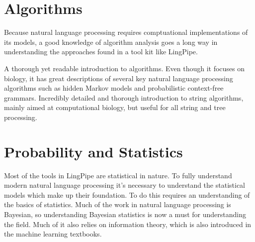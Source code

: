 %


\section{Algorithms}

\noindent
Because natural language processing requires comptuational
implementations of its models, a good knowledge of algorithm analysis
goes a long way in understanding the approaches found in a tool kit
like LingPipe.

\begin{itemize}
%
{A thorough yet readable introduction to algorithms.}
%
{Even though it focuses on biology, it has great
descriptions of several key natural language processing algorithms
such as hidden Markov models and probabilistic context-free grammars.}
%
{Incredibly detailed and thorough introduction to
string algorithms, mainly aimed at computational biology, but
useful for all string and tree processing.}
%
\end{itemize}






\section{Probability and Statistics}

\noindent
Most of the tools in LingPipe are statistical in nature.  To fully
understand modern natural language processing it's necessary to
understand the statistical models which make up their foundation.
To do this requires an understanding of the basics of statistics.
Much of the work in natural language processing is Bayesian, so
understanding Bayesian statistics is now a must for understanding
the field.  Much of it also relies on information theory, which is
also introduced in the machine learning textbooks.

